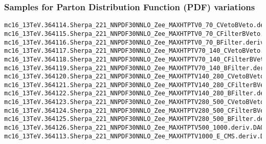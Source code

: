 \subsubsection{Samples for Parton Distribution Function (PDF) variations}

\begin{tiny}
\begin{verbatim}
mc16_13TeV.364114.Sherpa_221_NNPDF30NNLO_Zee_MAXHTPTV0_70_CVetoBVeto.deriv.DAOD_STDM7.e5299_s3126_r10724_p4398 
mc16_13TeV.364115.Sherpa_221_NNPDF30NNLO_Zee_MAXHTPTV0_70_CFilterBVeto.deriv.DAOD_STDM7.e5299_s3126_r10724_p4398
mc16_13TeV.364116.Sherpa_221_NNPDF30NNLO_Zee_MAXHTPTV0_70_BFilter.deriv.DAOD_STDM7.e5299_s3126_r10724_p4398
mc16_13TeV.364117.Sherpa_221_NNPDF30NNLO_Zee_MAXHTPTV70_140_CVetoBVeto.deriv.DAOD_STDM7.e5299_s3126_r10724_p4398 
mc16_13TeV.364118.Sherpa_221_NNPDF30NNLO_Zee_MAXHTPTV70_140_CFilterBVeto.deriv.DAOD_STDM7.e5299_s3126_r10724_p4398
mc16_13TeV.364119.Sherpa_221_NNPDF30NNLO_Zee_MAXHTPTV70_140_BFilter.deriv.DAOD_STDM7.e5299_s3126_r10724_p4398
mc16_13TeV.364120.Sherpa_221_NNPDF30NNLO_Zee_MAXHTPTV140_280_CVetoBVeto.deriv.DAOD_STDM7.e5299_s3126_r10724_p4398
mc16_13TeV.364121.Sherpa_221_NNPDF30NNLO_Zee_MAXHTPTV140_280_CFilterBVeto.deriv.DAOD_STDM7.e5299_s3126_r10724_p4398
mc16_13TeV.364122.Sherpa_221_NNPDF30NNLO_Zee_MAXHTPTV140_280_BFilter.deriv.DAOD_STDM7.e5299_s3126_r10724_p4398
mc16_13TeV.364123.Sherpa_221_NNPDF30NNLO_Zee_MAXHTPTV280_500_CVetoBVeto.deriv.DAOD_STDM7.e5299_s3126_r10724_p4398 
mc16_13TeV.364124.Sherpa_221_NNPDF30NNLO_Zee_MAXHTPTV280_500_CFilterBVeto.deriv.DAOD_STDM7.e5299_s3126_r10724_p4398
mc16_13TeV.364125.Sherpa_221_NNPDF30NNLO_Zee_MAXHTPTV280_500_BFilter.deriv.DAOD_STDM7.e5299_s3126_r10724_p4398 
mc16_13TeV.364126.Sherpa_221_NNPDF30NNLO_Zee_MAXHTPTV500_1000.deriv.DAOD_STDM7.e5299_s3126_r10724_p4398
mc16_13TeV.364113.Sherpa_221_NNPDF30NNLO_Zee_MAXHTPTV1000_E_CMS.deriv.DAOD_STDM7.e5271_s3126_r9364_p4357
\end{verbatim}
\end{tiny}
